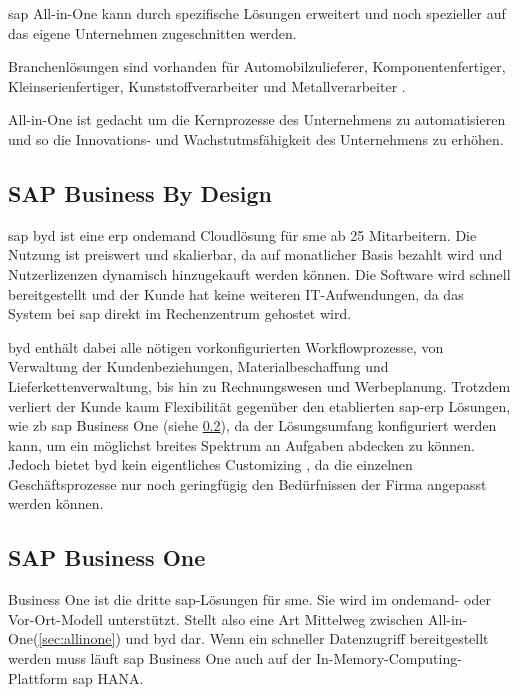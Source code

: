 \gls{sap} All-in-One kann durch spezifische Lösungen erweitert und noch spezieller auf das eigene Unternehmen zugeschnitten werden.

Branchenlösungen sind vorhanden für Automobilzulieferer, Komponentenfertiger, Kleinserienfertiger, Kunststoffverarbeiter und Metallverarbeiter \cite{AiOBeratung}.

All-in-One ist gedacht um die Kernprozesse des Unternehmens zu automatisieren und so die Innovations- und Wachstutmsfähigkeit des Unternehmens zu erhöhen.

\subsection{SAP Business By Design}
\label{sec:byd}

\gls{sap} \gls{byd} ist eine \gls{erp} \gls{ondemand} Cloudlösung für \gls{sme} ab 25 Mitarbeitern. Die Nutzung ist preiswert und skalierbar, da auf monatlicher Basis bezahlt wird und Nutzerlizenzen dynamisch hinzugekauft werden können. Die Software wird schnell bereitgestellt und der Kunde hat keine weiteren IT-Aufwendungen, da das System bei \gls{sap} direkt im Rechenzentrum gehostet wird.

\gls{byd} enthält dabei alle nötigen vorkonfigurierten Workflowprozesse, von Verwaltung der Kundenbeziehungen, Materialbeschaffung und Lieferkettenverwaltung, bis hin zu Rechnungswesen und Werbeplanung. Trotzdem verliert der Kunde kaum Flexibilität gegenüber den etablierten \gls{sap}-\gls{erp} Lösungen, wie \gls{zb} \gls{sap} Business One (siehe \ref{sec:business-one}), da der Lösungsumfang konfiguriert werden kann, um ein möglichst breites Spektrum an Aufgaben abdecken zu können. Jedoch bietet \gls{byd} kein eigentliches Customizing \cite{ERP4Students}, da die einzelnen Geschäftsprozesse nur noch geringfügig den Bedürfnissen der Firma angepasst werden können.

\subsection{SAP Business One}
\label{sec:business-one}

Business One ist die dritte \gls{sap}-Lösungen für \gls{sme}. Sie wird im \gls{ondemand}- oder Vor-Ort-Modell unterstützt. Stellt also eine Art Mittelweg zwischen All-in-One(\ref{sec:allinone}) und \gls{byd} dar. Wenn ein schneller Datenzugriff bereitgestellt werden muss läuft \gls{sap} Business One auch auf der In-Memory-Computing-Plattform \gls{sap} HANA.

